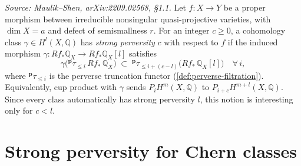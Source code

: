\begin{definition}[StrongPerversity]
  \label{def:strong-perversity}
  \textit{Source: Maulik--Shen, arXiv:2209.02568, §1.1.}
  Let $f \colon X \to Y$ be a proper morphism between irreducible nonsingular quasi-projective
  varieties, with $\dim X = a$ and defect of semismallness $r$.  For an integer $c \geq 0$,
  a cohomology class $\gamma \in H^l(X, \mathbb{Q})$ has \emph{strong perversity} $c$ with
  respect to $f$ if the induced morphism $\gamma \colon Rf_* \mathbb{Q}_X \to Rf_* \mathbb{Q}_X[l]$
  satisfies
  \[
    \gamma\bigl({{}^{\mathbf{p}}\tau_{\leq i}}\, Rf_*\, \mathbb{Q}_X\bigr)
    \;\subset\;
    {{}^{\mathbf{p}}\tau_{\leq i+(c-l)}}\bigl(Rf_*\, \mathbb{Q}_X[l]\bigr)
    \quad \forall\, i,
  \]
  where ${}^{\mathbf{p}}\tau_{\leq i}$ is the perverse truncation functor (\cref{def:perverse-filtration}).
  Equivalently, cup product with $\gamma$ sends $P_i H^m(X, \mathbb{Q})$ to
  $P_{i+c} H^{m+l}(X, \mathbb{Q})$.  Since every class automatically has strong perversity
  $l$, this notion is interesting only for $c < l$.
\end{definition}

\section{Strong perversity for Chern classes}

